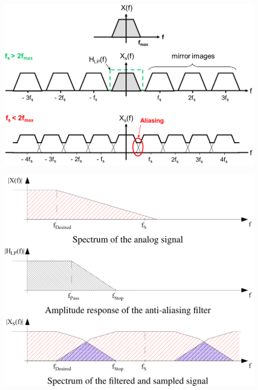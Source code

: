 \begin{minipage}{.475\textwidth}
	\begin{center}
		\includegraphics[width=\textwidth]{../fig/aliasing_frequency_domain}
	\end{center}
\end{minipage}
\begin{minipage}{.475\textwidth}
	\begin{center}
		\includegraphics[width=\textwidth]{../fig/aliasing}
	\end{center}
\end{minipage}

